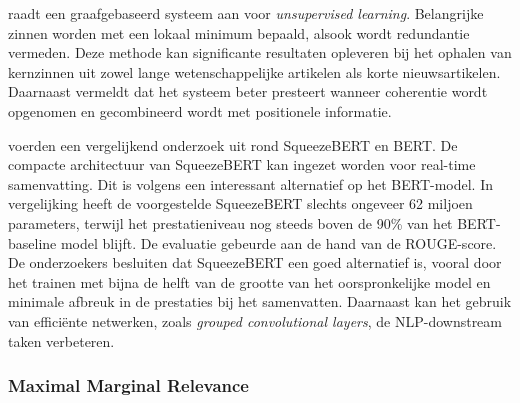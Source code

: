 \textcite{Parveen2015} raadt een graafgebaseerd systeem aan voor \textit{unsupervised learning}. Belangrijke zinnen worden met een lokaal minimum bepaald, alsook wordt redundantie vermeden. Deze methode kan significante resultaten opleveren bij het ophalen van kernzinnen uit zowel lange wetenschappelijke artikelen als korte nieuwsartikelen. Daarnaast vermeldt \textcite{Parveen2015} dat het systeem beter presteert wanneer coherentie wordt opgenomen en gecombineerd wordt met positionele informatie. %

\textcite{AbdelSalam2022} voerden een vergelijkend onderzoek uit rond SqueezeBERT en BERT. De compacte architectuur van SqueezeBERT kan ingezet worden voor real-time samenvatting. Dit is volgens \textcite{AbdelSalam2022} een interessant alternatief op het BERT-model. In vergelijking heeft de voorgestelde SqueezeBERT slechts ongeveer 62 miljoen parameters, terwijl het prestatieniveau nog steeds boven de 90\% van het BERT-baseline model blijft. De evaluatie gebeurde aan de hand van de ROUGE-score. De onderzoekers besluiten dat SqueezeBERT een goed alternatief is, vooral door het trainen met bijna de helft van de grootte van het oorspronkelijke model en minimale afbreuk in de prestaties bij het samenvatten. Daarnaast kan het gebruik van efficiënte netwerken, zoals \textit{grouped convolutional layers}, de NLP-downstream taken verbeteren. 


\subsubsection{Maximal Marginal Relevance}

